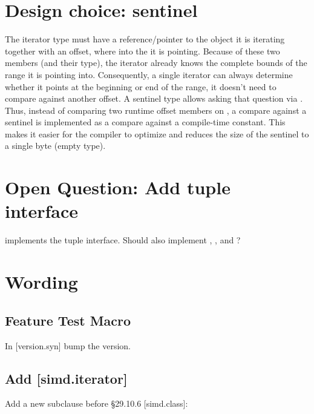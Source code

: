 \section{Design choice: sentinel}

The \simd iterator type must have a reference/pointer to the \simd object it is iterating together
with an offset, where into the \simd it is pointing.
Because of these two members (and their type), the iterator already knows the complete bounds of the
range it is pointing into.
Consequently, a single \simd iterator can always determine whether it points at the beginning or end
of the range, it doesn't need to compare against another offset.
A sentinel type allows asking that question via .
Thus, instead of comparing two runtime offset members on , a compare against a
sentinel is implemented as a compare against a compile-time constant.
This makes it easier for the compiler to optimize and reduces the size of the  sentinel
to a single byte (empty type).


\section{Open Question: Add tuple interface}

 implements the tuple interface.
Should  also implement , , and ?

\section{Wording}

\subsection{Feature Test Macro}
In [version.syn] bump the  version.

\subsection{Add [simd.iterator]}
Add a new subclause before §29.10.6 [simd.class]:

